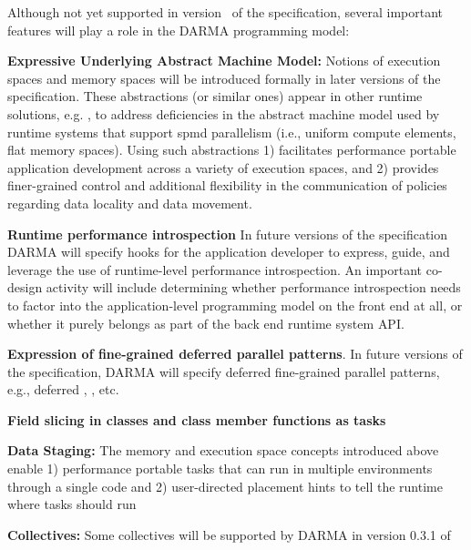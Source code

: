 Although not yet supported in version \specVersion\ of the specification, several
important features will play a role in the \gls{DARMA} \gls{programming model}:
\begin{compactdesc}
\item{\bf Expressive Underlying Abstract Machine Model:}
Notions of \glspl{execution space} and \glspl{memory space} will be introduced
formally in later
versions of the specification.  These abstractions (or similar ones) appear in other runtime
solutions, e.g. \cite{Kokkos, RAJA}, to
  address deficiencies in the \gls{abstract machine model} used by 
  \glspl{runtime system} that support \gls{spmd} parallelism (i.e., uniform compute elements, flat memory
    spaces).  Using such abstractions
1) facilitates performance portable application development across 
  a variety of \glspl{execution space}, and 2)
  provides finer-grained control and additional flexibility in the
  communication of policies regarding data locality and data movement. 
\item{\bf Runtime performance introspection}
  In future versions of the specification \gls{DARMA} will specify hooks for the
  application developer to express, guide, and leverage the use of runtime-level
  performance \gls{introspection}. An important \gls{co-design} activity will include determining
  whether performance \gls{introspection} needs to factor into the
  application-level \gls{programming
  model} on the \gls{front end} at all, or whether it purely belongs as part of the  \gls{back end}
  \gls{runtime system} \gls{API}.
\item{\bf Expression of fine-grained deferred parallel patterns}.
  In future versions of the specification, \gls{DARMA} will 
  specify deferred fine-grained parallel patterns, e.g., deferred
  , , etc.
\item{\bf Field slicing in classes and class member functions as tasks}
\item {\bf Data Staging:}
The memory and execution space concepts introduced above enable 1) performance portable tasks that can run in 
multiple environments through a single code and 2) user-directed placement hints to tell the runtime where tasks should run
\item {\bf Collectives:}
  Some collectives will be supported by \gls{DARMA} in version 0.3.1 of

\end{compactdesc}
